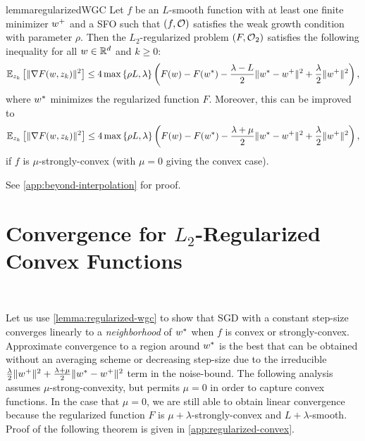 \begin{restatable}{lemma}{regularizedWGC}\label{lemma:regularized-wgc}
    Let \( f \) be an \( L \)-smooth function with at least one finite minimizer \( \wbar \) and \oracle{} a \ac{SFO} such that \( \rbr{f, \oracle{}} \) satisfies the weak growth condition with parameter \( \rho \).
    Then the \( L_2 \)-regularized problem \( \rbr{F, \oracle{}_2} \) satisfies the following inequality for all \( \w \in \R^d \) and \( k \geq 0 \):
    \[ \Ek\sbr{\norm{\nabla F(\w, \zk)}^2} \leq 4 \max\cbr{\rho L, \lambda} \rbr{F(\w) - F(\wopt) - \frac{\lambda - L}{2} \norm{\wopt - \wbar}^2 + \frac{\lambda}{2} \norm{\wbar}^2}, \]
    where \( \wopt \) minimizes the regularized function \( F \).
    Moreover, this can be improved to 
    \[ \Ek\sbr{\norm{\nabla F(\w, \zk)}^2} \leq 4 \max\cbr{\rho L, \lambda} \rbr{F(\w) - F(\wopt) - \frac{\lambda + \mu}{2} \norm{\wopt - \wbar}^2 + \frac{\lambda}{2} \norm{\wbar}^2}, \]
    if \( f \) is \( \mu \)-strongly-convex (with \( \mu = 0 \) giving the convex case).
\end{restatable}
\noindent See \autoref{app:beyond-interpolation} for proof.

\section{Convergence for \( L_2 \)-Regularized Convex Functions}~\label{sec:regularized-convex}

Let us use \autoref{lemma:regularized-wgc} to show that \ac{SGD} with a constant step-size converges linearly to a \emph{neighborhood} of \( \wopt \) when \( f \) is convex or strongly-convex.
Approximate convergence to a region around \( \wopt \) is the best that can be obtained without an averaging scheme or decreasing step-size due to the irreducible \( \frac{\lambda}{2} \norm{\wbar}^2 + \frac{\lambda + \mu}{2} \norm{\wopt - \wbar}^2 \) term in the noise-bound.
The following analysis assumes \( \mu \)-strong-convexity, but permits \( \mu = 0 \) in order to capture convex functions.
In the case that \( \mu = 0 \), we are still able to obtain linear convergence because the regularized function \( F \) is \( \mu + \lambda \)-strongly-convex and \( L + \lambda \)-smooth. 
Proof of the following theorem is given in \autoref{app:regularized-convex}.
\newpage 

